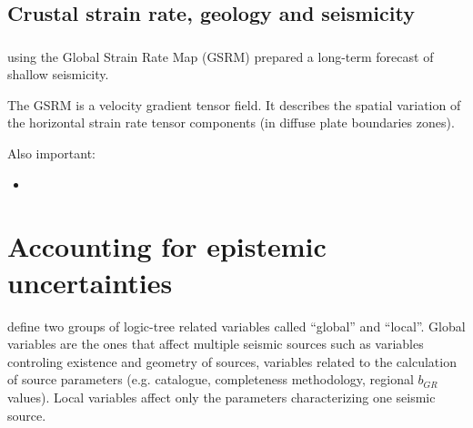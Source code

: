 \subsection{Crustal strain rate, geology and seismicity}
\subsubsection{\cite{ward94}}

\subsubsection{\cite{bird10}}
\cite{bird10} using the Global Strain Rate Map (GSRM) \citep{kreemer03} prepared a 
long-term forecast of shallow seismicity.  

The GSRM is a velocity gradient tensor field. It describes the  
spatial variation of the horizontal strain rate tensor components (in diffuse plate
boundaries zones).

Also important: 
\begin{itemize}
\item \cite{kagan2010}
\end{itemize}

%
\newpage
\section{Accounting for epistemic uncertainties}
\cite{coppersmith2009} define two groups of logic-tree related variables called 
``global'' and ``local''. Global variables are the ones that affect multiple 
seismic sources such as variables controling existence and geometry of sources,
variables related to the calculation of source parameters (e.g. catalogue, 
completeness methodology, regional $b_{GR}$ values). Local variables affect only
the parameters characterizing one seismic source.
